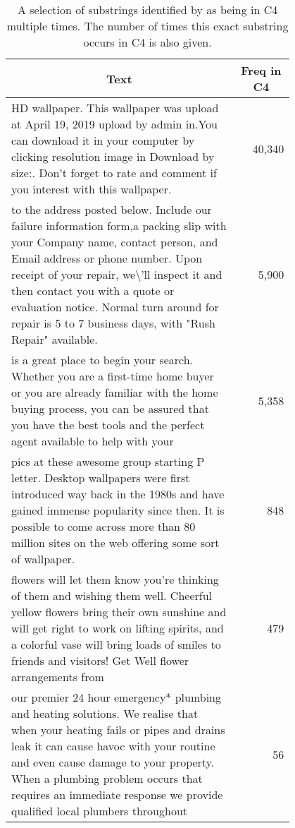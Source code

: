 \begin{table*}[h]
  \centering
  \caption{A selection of substrings identified by \Exact{} as being in C4 multiple times. The number of times this exact substring occurs in C4 is also given.}
  \tiny
    \begin{tabular}{p{0.8\linewidth}|r}
    \toprule
    \multicolumn{1}{c|}{\textbf{Text}}  & \multicolumn{1}{c}{\textbf{Freq in C4}} \\
    \midrule
    HD wallpaper. This wallpaper was upload at April 19, 2019 upload by admin in.You can download it in your computer by clicking resolution image in Download by size:. Don't forget to rate and comment if you interest with this wallpaper. &            40,340  \\
    \hline
    to the address posted below. Include our failure information form,a packing slip with your Company name, contact person, and Email address or phone number. Upon receipt of your repair, we\textbackslash{}'ll inspect it and then contact you with a quote or evaluation notice. Normal turn aro\newline{}und for repair is 5 to 7 business days, with "Rush Repair" available. &              5,900  \\
    \hline
    is a great place to begin your search. Whether you are a first-time home buyer or you are already familiar with the home buying process, you can be assured that you have the best tools and the perfect agent available to help with your &              5,358  \\
    \hline
    pics at these awesome group starting P letter. Desktop wallpapers were first introduced way back in the 1980s and have gained immense popularity since then. It is possible to come across more than 80 million sites on the web offering some sort of wallpaper. &                 848  \\
    \hline
    flowers will let them know you're thinking of them and wishing them well. Cheerful yellow flowers bring their own sunshine and will get right to work on lifting spirits, and a colorful vase will bring loads of smiles to friends and visitors! Get Well flower arrangements from &                 479  \\
    \hline
    our premier 24 hour emergency* plumbing and heating solutions. We realise that when your heating fails or pipes and drains leak it can cause havoc with your routine and even cause damage to your property. When a plumbing problem occurs that requires an immediate response we provide qualified local plumbers throughout &                   56  \\

\end{tabular}
\end{table*}
